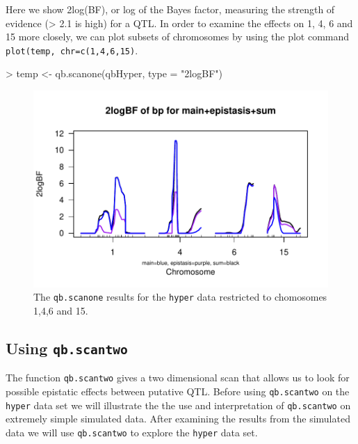 \documentclass[12pt]{article}
\begin{document}
Here we show 2log(BF), or log of the Bayes factor,
measuring the strength of evidence (> 2.1 is high) for a QTL.
In order to examine the effects on 1, 4, 6 and 15 more closely, we can
plot subsets of chromosomes by using the plot 
command {\tt plot(temp, chr=c(1,4,6,15)}.  
\begin{Schunk}
\begin{Sinput}
> temp <- qb.scanone(qbHyper, type = "2logBF")
\end{Sinput}
\end{Schunk}
\begin{figure}
\includegraphics{scanPDF/FIG-Scanone-HyperSubset}
\caption{The {\tt qb.scanone} results for the {\tt hyper} data restricted 
to chomosomes 1,4,6 and 15.}
\label{fig-subsetsqb.scanone}
\end{figure}

\subsection{Using {\tt qb.scantwo}}
The function {\tt qb.scantwo} gives a two dimensional scan that allows us 
to look for possible epistatic effects between  putative QTL.   Before 
using {\tt qb.scantwo} on the {\tt hyper} data set we will illustrate the 
the use and interpretation of {\tt qb.scantwo} on extremely simple 
simulated data.  After examining the results from the simulated data we 
will use {\tt qb.scantwo} to explore the {\tt hyper} data set. 
 
\end{document}
